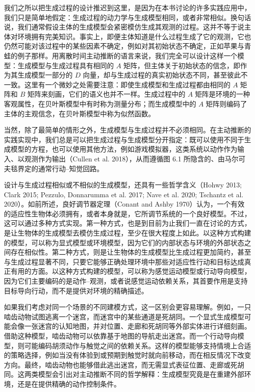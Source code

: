 我们之所以把生成过程的设计推迟到这里，是因为在本书讨论的许多实践应用中，我们只是简单地假定：生成过程的动力学与生成模型相同，或者非常相似。换句话说，我们通常假设主体的生成模型会紧密模仿生成其观测的过程。这并不等于说主体对环境拥有完美知识。事实上，即便主体知道是什么过程生成了它的观测，它也仍然可能对该过程中的某些因素不确定，例如对其初始状态不确定，正如苹果与青蛙的例子那样。用离散时间主动推断的语言来说，我们完全可以设计这样一个模型：生成模型与生成过程具有相同的 $A$ 矩阵，但主体关于初始状态的信念，即作为其生成模型一部分的 $D$ 向量，却与生成过程的真实初始状态不同，甚至彼此不一致。这里有一个微妙之处需要注意：即使生成模型和生成过程都由相同的 $A$ 矩阵和 $B$ 矩阵来刻画，它们的语义也并不一样。生成过程中的 $A$ 矩阵是环境的一种客观属性，在贝叶斯模型中有时称为测量分布；而生成模型中的 $A$ 矩阵则编码了主体的主观信念，在贝叶斯模型中称为似然函数。

当然，除了最简单的情形之外，生成模型与生成过程并不必须相同。在主动推断的实践实现中，我们总是可以把生成过程与生成模型分开指定：既可以使用不同于生成模型的方程，也可以使用其他方法，例如游戏模拟器，这类系统以动作作为输入、以观测作为输出（Cullen et al. 2018），从而遵循图 6.1 所隐含的、由马尔可夫毯界定的通常行动--知觉回路。

设计与生成过程相似或不相似的生成模型，还具有一些哲学含义（Hohwy 2013; Clark 2015; Pezzulo, Donnarumma et al. 2017; Nave et al. 2020; Tschantz et al. 2020）。如前所述，良好调节器定理（Conant and Ashby 1970）认为，一个有效的适应性生物体必须拥有，或者本身就是，它所调节系统的一个良好模型。不过，这可以通过多种方式实现。第一种方式，也是到目前为止我们一直在讨论的方式，是让生物体的生成模型去模仿生成过程，至少在很大程度上如此。以这种方式构建的模型，可以称为显式模型或环境模型，因为它们的内部状态与环境的外部状态之间存在相似性。第二种方式，则是让生物体的生成模型比生成过程更加简约，甚至与生成过程显著不同，只要它能够正确处理环境中那些对适应性行动和目标达成真正有用的方面。以这种方式构建的模型，可以称为感觉运动模型或行动导向模型，因为它们主要编码的是动作--观测，或者说感觉运动依赖关系，其首要作用是支持目标导向行动，而不是提供对环境的精确描述。

如果我们考虑对同一个场景的不同建模方式，这一区别会更容易理解。例如，一只啮齿动物试图逃离一个迷宫，而迷宫中的某些通道是死胡同。一个显式生成模型可能会像一张迷宫的认知地图，并对位置、走廊和死胡同等外部实体进行详细刻画。借助这种模型，啮齿动物可以依靠基于地图的导航走出迷宫。而一个行动导向模型，则可能编码胡须动作与触觉之间的依赖关系。这样的模型能够支持情境上合适的策略选择，例如当没有体验到或预期到触觉时就向前移动，而在相反情况下改变方向。最终，啮齿动物也能够借此逃出迷宫，而无需显式表征位置、走廊或死胡同。这两类模型会引出对主动推断不同的哲学解释：生成模型究竟是在重建外部环境，还是在提供精确的动作控制条件。

